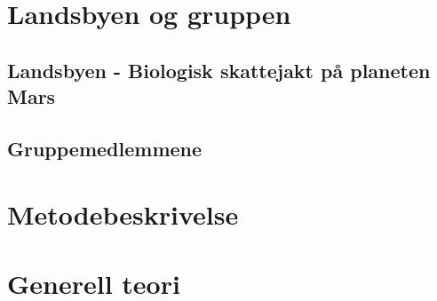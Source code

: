 \documentclass[DIV=calc, paper=a4, fontsize=12pt]{scrartcl}	 %
\begin{document}
\begin{multicols}{2}

\end{multicols}


\section{Landsbyen og gruppen}

\begin{multicols}{2}


\subsection{Landsbyen - Biologisk skattejakt på planeten Mars}



\subsection{Gruppemedlemmene}










\end{multicols}


\section{Metodebeskrivelse}

\begin{multicols}{2}




\end{multicols}


\section{Generell teori}
\end{document}
